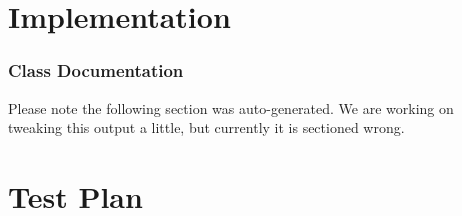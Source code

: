 \documentclass{report}
\begin{document}
\chapter{Implementation}

	\subsection{Class Documentation}

Please note the following section was auto-generated. We are
working on tweaking this output a little, but currently it is
sectioned wrong.

%
%
%
%
%
%
%
%
%
%

\chapter{Test Plan}
\end{document}
